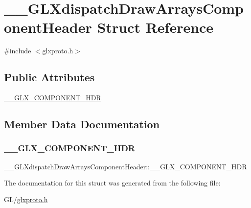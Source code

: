 \hypertarget{struct_____g_l_xdispatch_draw_arrays_component_header}{}\section{\+\_\+\+\_\+\+G\+L\+Xdispatch\+Draw\+Arrays\+Component\+Header Struct Reference}
\label{struct_____g_l_xdispatch_draw_arrays_component_header}


{\ttfamily \#include $<$glxproto.\+h$>$}

\subsection*{Public Attributes}
\begin{DoxyCompactItemize}
\item 
\hyperlink{struct_____g_l_xdispatch_draw_arrays_component_header_a47a7391742eec95e2332885fe76bb451}{\+\_\+\+\_\+\+G\+L\+X\+\_\+\+C\+O\+M\+P\+O\+N\+E\+N\+T\+\_\+\+H\+DR}
\end{DoxyCompactItemize}


\subsection{Member Data Documentation}
\mbox{\label{struct_____g_l_xdispatch_draw_arrays_component_header_a47a7391742eec95e2332885fe76bb451}} 
\subsubsection{\texorpdfstring{\+\_\+\+\_\+\+G\+L\+X\+\_\+\+C\+O\+M\+P\+O\+N\+E\+N\+T\+\_\+\+H\+DR}{\_\_GLX\_COMPONENT\_HDR}}
{\footnotesize\ttfamily \+\_\+\+\_\+\+G\+L\+Xdispatch\+Draw\+Arrays\+Component\+Header\+::\+\_\+\+\_\+\+G\+L\+X\+\_\+\+C\+O\+M\+P\+O\+N\+E\+N\+T\+\_\+\+H\+DR}



The documentation for this struct was generated from the following file\+:\begin{DoxyCompactItemize}
\item 
G\+L/\hyperlink{glxproto_8h}{glxproto.\+h}\end{DoxyCompactItemize}

